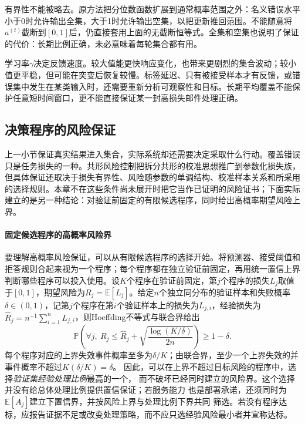 有界性不能被略去。原方法把分位数函数扩展到通常概率范围之外：名义错误水平小于0时允许输出全集，大于1时允许输出空集，以把更新推回范围。不能随意将$a^{(t)}$截断到$[0,1]$后，仍直接套用上面的无截断恒等式。全集和空集也说明了保证的代价：长期比例正确，未必意味着每轮集合都有用。

学习率$\gamma$决定反馈速度。较大值能更快响应变化，也带来更剧烈的集合波动；较小值更平稳，但可能在突变后恢复较慢。标签延迟、只有被接受样本才有反馈，或错误集中发生在某类输入时，还需要重新分析可观察性和目标。长期平均覆盖不能保护任意短时间窗口，更不能直接保证某一封高损失邮件处理正确。

\subsection{决策程序的风险保证}

上一小节保证真实结果进入集合，实际系统却还需要决定采取什么行动。覆盖错误只是任务损失的一种。共形风险控制把拆分共形的校准思想推广到参数化损失族，但具体保证还取决于损失有界性、风险随参数的单调结构、校准样本关系和所采用的选择规则。本章不在这些条件尚未展开时把它当作已证明的风险证书；下面实际建立的是另一种结论：对验证前固定的有限候选程序，同时给出高概率期望风险上界。

\paragraph{固定候选程序的高概率风险界}

要理解高概率风险保证，可以从有限候选程序的选择开始。将预测器、接受阈值和拒答规则合起来视为一个程序；每个程序都在独立验证前固定，再用统一置信上界判断哪些程序可以投入使用。设$K$个程序在验证前固定，第$j$个程序的损失$L_j$取值于$[0,1]$，期望风险为$R_j=\mathbb E[L_j]$。给定$n$个独立同分布的验证样本和失败概率$\delta\in(0,1)$，记第$j$个程序在第$i$个验证样本上的损失为$L_{j,i}$，经验损失为$\hat R_j=n^{-1}\sum_{i=1}^{n}L_{j,i}$，则Hoeffding不等式与联合界给出
\begin{equation}
 \mathbb P\left(
  \forall j,\ R_j\leq
  \hat R_j+\sqrt{\frac{\log(K/\delta)}{2n}}
 \right)\geq1-\delta.
 \label{eq:reliability-finite-program-bound}
\end{equation}
每个程序对应的上界失效事件概率至多为$\delta/K$；由联合界，至少一个上界失效的并事件概率不超过$K(\delta/K)=\delta$。
因此，可以在上界不超过目标风险的程序中，选择\emph{验证集经验处理比例}最高的一个，
而不破坏已经同时建立的风险界。这个选择并没有给总体处理比例提供置信保证；若服务能力
也是部署承诺，还须同时为$\mathbb E[A_j]$建立下置信界，并按风险上界与处理比例下界共同
筛选。若没有程序达标，应报告证据不足或改变处理策略，而不应只选经验风险最小者并宣称达标。

